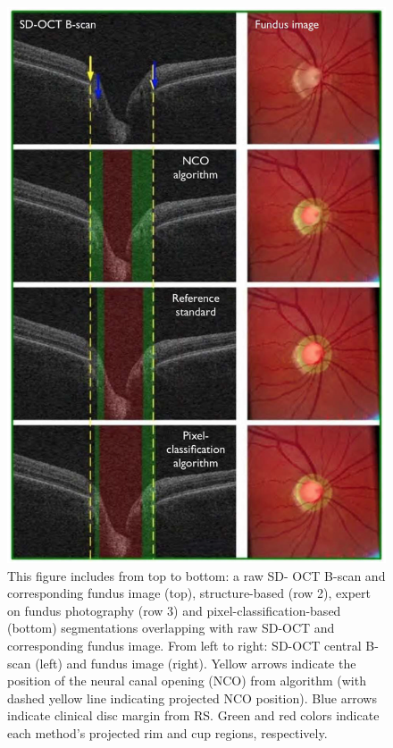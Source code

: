 \begin{figure}[htbp]
\centering
\includegraphics{figures/morgan_6}
\caption{This figure includes from top to bottom: a raw SD- OCT B-scan and corresponding
fundus image (top), structure-based (row 2), expert on fundus photography (row 3) and
pixel-classification-based (bottom) segmentations overlapping with raw SD-OCT and
corresponding fundus image.  From left to right: SD-OCT central B- scan (left) and
fundus image (right).  Yellow arrows indicate the position of the neural canal opening
(NCO) from algorithm (with dashed yellow line indicating projected NCO position).
Blue arrows indicate clinical disc margin from RS. Green and red colors indicate each
method’s projected rim and cup regions, respectively. \cite{mbib_4} }
\label{fig:m_6}
\end{figure}

